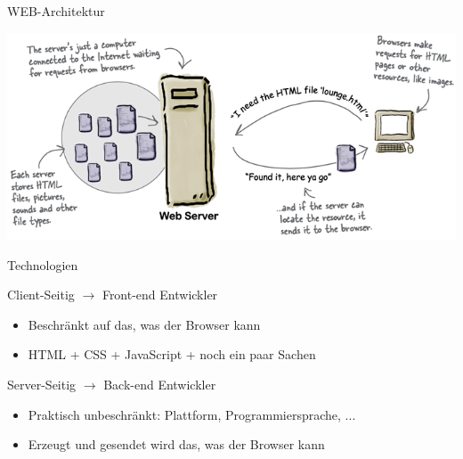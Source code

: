 
\begin{definition}{WEB-Architektur}
    
    \includegraphics[width=1\linewidth]{images/web_architektur.png}
\end{definition}

\begin{concept}{Technologien}
    
    Client-Seitig $\rightarrow$ Front-end Entwickler
    \begin{itemize}
        \item Beschränkt auf das, was der Browser kann
        \item HTML + CSS + JavaScript + noch ein paar Sachen
    \end{itemize}

    Server-Seitig $\rightarrow$ Back-end Entwickler
    \begin{itemize}
        \item Praktisch unbeschränkt: Plattform, Programmiersprache, ...
        \item Erzeugt und gesendet wird das, was der Browser kann
    \end{itemize}
\end{concept}